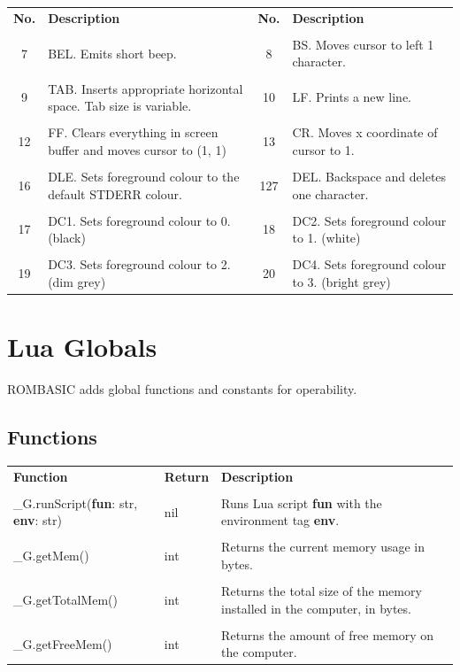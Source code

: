 \documentclass[10pt, stock]{memoir}
\newcommand{\unemph}[1]{\textcolor{brightgrey}{#1}}
\let\oldsection\section
\renewcommand\section{\clearpage\oldsection}
\begin{document}
\begin{tabularx}{\textwidth}{c X c X}
	\textbf{\large No.} & \textbf{\large Description} & \textbf{\large No.} & \textbf{\large Description}
	\\ \\
	\endhead
	7 & BEL. Emits short beep. & 8 & BS. Moves cursor to left 1 character.
	\\ \\
	9 & TAB. Inserts appropriate horizontal space. Tab size is variable. & 10 & LF. Prints a new line.
	\\ \\
	12 & FF. Clears everything in screen buffer and moves cursor to (1, 1) & 13 & CR. Moves x coordinate of cursor to 1.
	\\ \\
	16 & DLE. Sets foreground colour to the default STDERR colour. & 127 & DEL. Backspace and deletes one character.
	\\ \\
	17 & DC1. Sets foreground colour to 0. (black) & 18 & DC2. Sets foreground colour to 1. (white)
	\\ \\
	19 & DC3. Sets foreground colour to 2. (dim grey) & 20 & DC4. Sets foreground colour to 3. (bright grey)
\end{tabularx}



\section{Lua Globals}

ROMBASIC adds global functions and constants for operability.

\subsection{Functions}

\begin{tabularx}{\textwidth}{l l X}
	\textbf{\large Function} & \textbf{\large Return} & \textbf{\large Description}
	\\ \\
	\endhead
	\unemph{\_G.}runScript(\textbf{fun}: str, \textbf{env}: str) & nil & Runs Lua script \textbf{fun} with the environment tag \textbf{env}.
	\\ \\
	\unemph{\_G.}getMem() & int & Returns the current memory usage in bytes.
	\\ \\
	\unemph{\_G.}getTotalMem() & int & Returns the total size of the memory installed in the computer, in bytes.
	\\ \\
	\unemph{\_G.}getFreeMem() & int & Returns the amount of free memory on the computer.
\end{tabularx}
\end{document}
